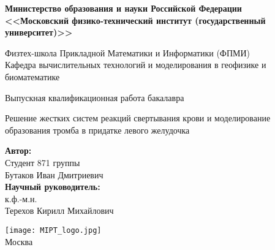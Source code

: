 \begin{center}
    \large\textbf{Министерство образования и науки Российской Федерации \\
    <<Московский физико-технический институт (государственный
    университет)>>} \\
    \vspace{1cm}

    Физтех-школа Прикладной Математики и Информатики (ФПМИ) \\

    Кафедра вычислительных технологий и моделирования в геофизике и биоматематике \\

    \vspace{3em}

    Выпускная квалификационная работа бакалавра
\end{center}

\begin{center}
    \vspace{\fill}
    \LARGE{Решение жестких систем реакций свертывания крови и моделирование образования тромба в придатке левого желудочка}

    \vspace{\fill}
\end{center}


\begin{flushright}
    \textbf{Автор:} \\
    Студент 871 группы \\
    Бутаков Иван Дмитриевич \\
    \vspace{2em}
    \textbf{Научный руководитель:} \\
    к.ф.-м.н. \\
    Терехов Кирилл Михайлович \\
\end{flushright}

\vspace{\fill}

\begin{center}
    \texttt{[image: MIPT\_logo.jpg]}\\
    Москва \the\year{}
\end{center}

\thispagestyle{empty}

\newpage
\fancyfoot[C]{\thepage}
\fancyhead[L]{}
\fancyhead[R]{}
